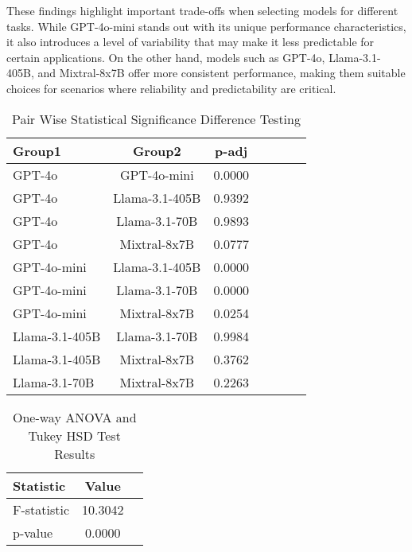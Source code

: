 These findings highlight important trade-offs when selecting models for different tasks. While GPT-4o-mini stands out with its unique performance characteristics, it also introduces a level of variability that may make it less predictable for certain applications. On the other hand, models such as GPT-4o, Llama-3.1-405B, and Mixtral-8x7B offer more consistent performance, making them suitable choices for scenarios where reliability and predictability are critical.

\begin{table}[!htb]\footnotesize
\vspace{0.5em}

\begin{tabular}{lcccccc}
\hline
\textbf{Group1}    & \textbf{Group2}       & \textbf{p-adj} \\ \hline
GPT-4o            & GPT-4o-mini                   & 0.0000                   \\
GPT-4o            & Llama-3.1-405B                 & 0.9392             \\
GPT-4o            & Llama-3.1-70B                & 0.9893                \\
GPT-4o            & Mixtral-8x7B                      & 0.0777                  \\
GPT-4o-mini      & Llama-3.1-405B                 & 0.0000              \\
GPT-4o-mini      & Llama-3.1-70B                    & 0.0000               \\
GPT-4o-mini      & Mixtral-8x7B                       & 0.0254            \\
Llama-3.1-405B   & Llama-3.1-70B                & 0.9984                \\
Llama-3.1-405B   & Mixtral-8x7B                     & 0.3762           \\
Llama-3.1-70B    & Mixtral-8x7B                 & 0.2263              \\ \hline
\end{tabular}%
\caption{Pair Wise Statistical Significance Difference Testing}
\label{tab:pair_wise}
\end{table}


\vspace{-3mm}

\begin{table}[htb]\footnotesize
\centering
\begin{tabular}{lcc}
\hline
\textbf{Statistic} & \textbf{Value} \\ \hline
F-statistic        & 10.3042        \\
p-value            & 0.0000         \\ \hline
\end{tabular}%
\caption{One-way ANOVA and Tukey HSD Test Results}
\label{tab:anova_tukey_results}

\end{table}



